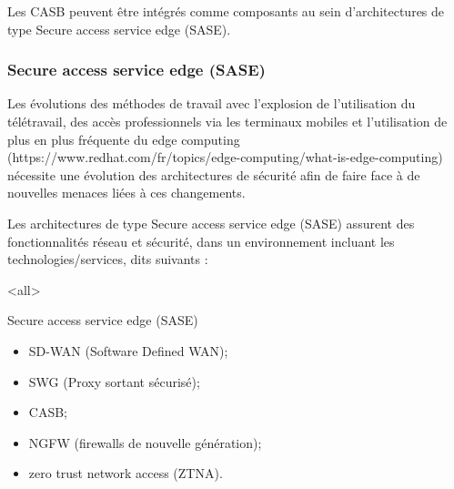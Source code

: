 Les CASB peuvent être intégrés comme composants au sein d'architectures de type Secure access service edge (SASE).

\subsubsection{Secure access service edge (SASE)}
Les évolutions des méthodes de travail avec l'explosion de l'utilisation du télétravail, des accès professionnels via les terminaux mobiles et l'utilisation de plus en plus fréquente du edge computing (https://www.redhat.com/fr/topics/edge-computing/what-is-edge-computing) nécessite une évolution des architectures de sécurité afin de faire face à de nouvelles menaces liées à ces changements.

Les architectures de type Secure access service edge (SASE) assurent des fonctionnalités réseau et sécurité, dans un environnement  incluant les technologies/services, dits  suivants :

\mode<all>{\texframe
{Secure access service edge (SASE)} %
{} %
{
\begin{itemize}
    \item SD-WAN (Software Defined WAN);
    \item SWG (Proxy sortant sécurisé);
    \item CASB;
    \item NGFW (firewalls de nouvelle génération);
    \item zero trust network access (ZTNA).
\end{itemize}
}}

